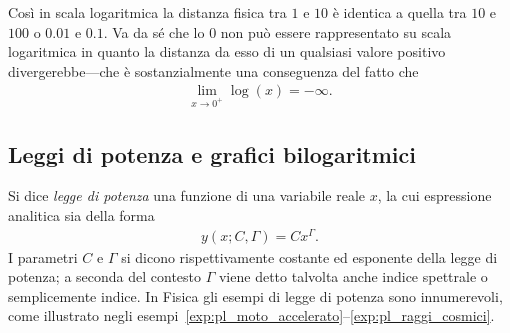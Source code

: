 Così in scala logaritmica la distanza fisica tra $1$ e $10$ è identica a
quella tra $10$ e $100$ o $0.01$ e $0.1$. Va da sé che lo $0$ non può
essere rappresentato su scala logaritmica in quanto la distanza da esso
di un qualsiasi valore positivo divergerebbe---che è sostanzialmente una
conseguenza del fatto che
\begin{align*}
  \lim_{x\rightarrow 0^+} \log(x) = -\infty.
\end{align*}


\subsection{Leggi di potenza e grafici bilogaritmici}
\label{subsec:bilog}

Si dice \emph{legge di potenza} una funzione di una variabile reale $x$,
la cui espressione analitica sia della forma
\begin{align}\label{eq:legge_di_potenza}
  y(x; C, \Gamma) = Cx^\Gamma.
\end{align}
I parametri $C$ e $\Gamma$ si dicono rispettivamente costante ed esponente della
legge di potenza; a seconda del contesto $\Gamma$ viene detto talvolta anche
indice spettrale o semplicemente indice. In Fisica gli esempi di legge di potenza
sono innumerevoli, come illustrato negli
esempi~\ref{exp:pl_moto_accelerato}--\ref{exp:pl_raggi_cosmici}.

